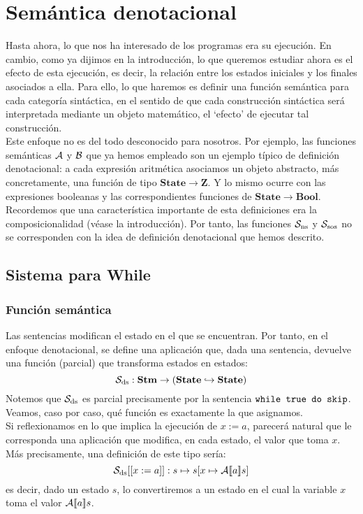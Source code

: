 \cleardoublepage
\chapter{Semántica denotacional}


Hasta ahora, lo que nos ha interesado de los programas era su ejecución. En cambio, como ya dijimos en la introducción, lo que queremos estudiar ahora es el efecto de esta ejecución, es decir, la relación entre los estados iniciales y los finales asociados a ella.  Para ello, lo que haremos es definir una función semántica para cada categoría sintáctica, en el sentido de que cada construcción sintáctica será interpretada mediante un objeto matemático, el `efecto' de ejecutar tal construcción. 
\\

Este enfoque no es del todo desconocido para nosotros. Por ejemplo, las funciones semánticas $\mathcal{A}$ y $\mathcal{B}$ que ya hemos empleado son un ejemplo típico de definición denotacional: a cada expresión aritmética asociamos un objeto abstracto, más concretamente, una función de tipo $\mathbf{State}\rightarrow \mathbf{Z}$. Y lo mismo ocurre con las expresiones booleanas y las correspondientes funciones de $\mathbf{State}\rightarrow \mathbf{Bool}$. Recordemos que una característica importante de esta definiciones era la composicionalidad (véase la introducción). Por tanto, las funciones $\mathcal{S}_{\mathrm{ns}}$ y $\mathcal{S}_{\mathrm{sos}}$ no se corresponden con la idea de definición denotacional que hemos descrito.

\section{Sistema para While}

\subsection{Función semántica}

Las sentencias modifican el estado en el que se encuentran. Por tanto, en el enfoque denotacional, se define una aplicación que, dada una sentencia, devuelve una función (parcial) que transforma estados en estados:
\[
    \mathcal{S}_{\mathrm{ds}} : \mathbf{Stm} \to (\textbf{State} \hookrightarrow \textbf{State})
\]
Notemos que $ \mathcal{S}_{\mathrm{ds}}$ es parcial precisamente por la sentencia $\texttt{while true do skip}$. Veamos, caso por caso, qué función es exactamente la que asignamos.
\\

Si reflexionamos en lo que implica la ejecución de $x:= a$, parecerá natural que le corresponda una aplicación que modifica, en cada estado, el valor que toma $x$. Más precisamente, una definición de este tipo sería:
\[
    \mathcal{S}_{\mathrm{ds}} [[x:=a]] : s \mapsto s[x\mapsto \mathcal{A}[\![a]\!]s]
\]
es decir, dado un estado $s$, lo convertiremos a un estado en el cual la variable $x$ toma el valor $\mathcal{A}[\![a]\!]s$. 
\\

